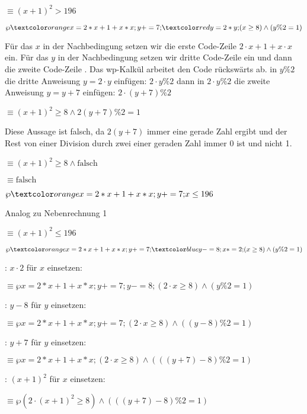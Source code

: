 \documentclass{lehramt-informatik-haupt}
\def\MatheEnv#1{
  \medskip

  \hspace{2em}#1

  \medskip
}
\def\Mathe#1{
  \MatheEnv{$#1$}
}
\def\MatheEquiv#1{
  \MatheEnv{$\equiv$\hspace{2em}$#1$}
}
\def\Erklaerung#1{
  \medskip
  {\footnotesize#1}
}
\begin{document}
\begin{antwort}
\MatheEquiv{
  (x + 1)^2 > 196
}

%


\Mathe{
  \wp{\A\B}{\Q}
}

\Erklaerung{Für das $x$ in der Nachbedingung setzen wir die erste
Code-Zeile $2 \cdot x + 1 + x \cdot x$ ein.
%
Für das $y$ in der Nachbedingung setzen wir dritte Code-Zeile
\texttt{\AnweisungIII} ein und dann die zweite Code-Zeile
\texttt{\AnweisungII}. Das wp-Kalkül arbeitet den Code rückswärts ab.
%
in $y \% 2$ die dritte Anweisung $y = 2 \cdot y$ einfügen: $2 \cdot y \%
2$
%
dann in $2 \cdot y \% 2$ die zweite Anweisung $y = y + 7$ einfügen: $2
\cdot (y + 7) \% 2$}

\MatheEquiv{
  (x + 1)^2 \geq 8 \land 2(y + 7)\%2 = 1
}

\Erklaerung{Diese Aussage ist falsch, da $2(y + 7)$ immer eine gerade
Zahl ergibt und der Rest von einer Division durch zwei einer geraden
Zahl immer 0 ist und nicht 1.}

\MatheEquiv{
  (x + 1)^2 \geq 8 \land \text{falsch}
}

\MatheEquiv{
  \text{falsch}
}

%


\Mathe{
  \wp{\A}{x \leq 196}
}

\Erklaerung{Analog zu Nebenrechnung 1}

\MatheEquiv{
  (x + 1)^2 \leq 196
}

%


\Mathe{
  \wp{\A\C}{\Q}
}

\Erklaerung{: $x \cdot 2$ für $x$ einsetzen:}

\MatheEquiv{
  \wp{x=2*x+1+x*x;y+=7;y-=8;}
  {(2 \cdot x \geq 8) \land (y \% 2 = 1)}
}

\Erklaerung{: $y - 8$ für $y$ einsetzen:}

\MatheEquiv{
  \wp{x=2*x+1+x*x;y+=7;}
  {(2 \cdot x \geq 8) \land ((y - 8) \% 2 = 1)}
}

\Erklaerung{: $y + 7$ für $y$ einsetzen:}

\MatheEquiv{
  \wp{x=2*x+1+x*x;}
  {(2 \cdot x \geq 8) \land (((y + 7) - 8) \% 2 = 1)}
}

\Erklaerung{: $(x + 1)^2$ für $x$ einsetzen:}

\MatheEquiv{
\wp{}
  {(2 \cdot (x + 1)^2 \geq 8) \land (((y + 7) - 8) \% 2 = 1)}
}


\end{antwort}
\end{document}
